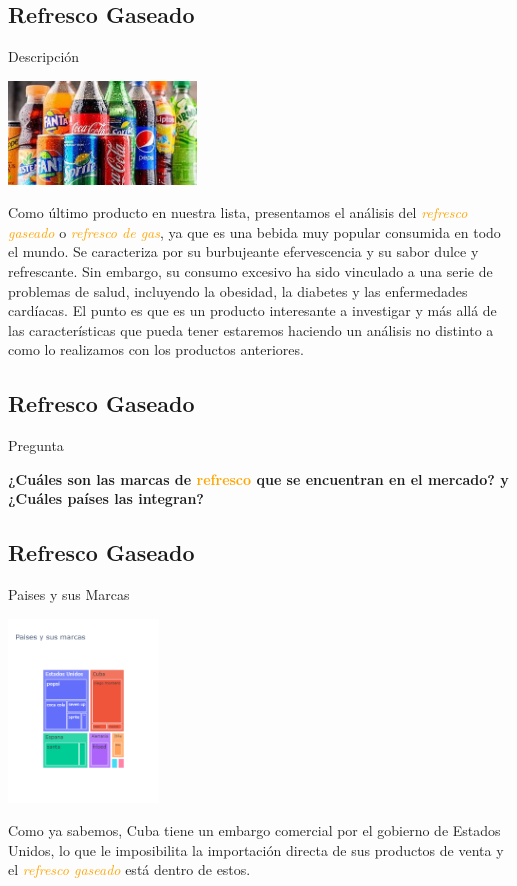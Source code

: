 \subsection{Refresco Gaseado}
\begin{frame}[fragile]{Descripción}
  \begin{center}
    \includegraphics[width=5cm]{refresco.jpeg}
  \end{center}
  Como último producto en nuestra lista, presentamos el análisis del \textit{\Large\textcolor{orange}{refresco gaseado}} o \textit{\Large\textcolor{orange}{refresco de gas}}, ya que es una bebida muy popular consumida en todo el mundo. 
  Se caracteriza por su burbujeante efervescencia y su sabor dulce y refrescante. 
  Sin embargo, su consumo excesivo ha sido vinculado a una serie de problemas de salud, incluyendo la obesidad, la diabetes y las enfermedades cardíacas. 
  El punto es que es un producto interesante a investigar y más allá de las características que pueda tener estaremos haciendo un análisis no distinto a como lo realizamos con los productos anteriores.
\end{frame}

\subsection{Refresco Gaseado}
\begin{frame}[fragile]{Pregunta}
  \begin{center}
    \textbf{\Large¿Cuáles son las marcas de \Large\textcolor{orange}{refresco} que se encuentran en el mercado? y ¿Cuáles países las integran?}
  \end{center}
\end{frame}

\subsection{Refresco Gaseado}
\begin{frame}[fragile]{Paises y sus Marcas}
  \begin{center}
    \includegraphics[width=4cm]{refresco.png}
  \end{center}
  Como ya sabemos, Cuba tiene un embargo comercial por el gobierno de Estados Unidos, lo que le imposibilita la importación directa de sus productos de venta y el \textit{\Large\textcolor{orange}{refresco gaseado}} está dentro de estos.
\end{frame}

